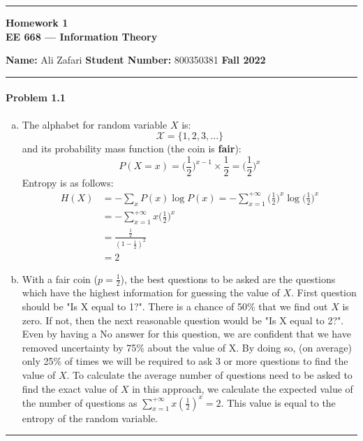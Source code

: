 \documentclass[12pt, letterpaper]{scrartcl}
\begin{document}
    \begin{center}
    	\hrule
    	\vspace{0.4cm}
    	{\textbf { {\large Homework 1} \\ EE 668 --- Information Theory}}
    \end{center}
    { \textbf{Name:} Ali Zafari \hspace{\fill} \textbf{Student Number:} 800350381 \hspace{\fill} \textbf{Fall 2022} } \newline\hrule

\paragraph*{Problem 1.1} \hfill
\begin{enumerate}[a.]
    \item The alphabet for random variable $X$ is:
        \begin{equation*}
            \mathcal{X}=\{1, 2, 3, ...\}
        \end{equation*}
        and its probability mass function (the coin is \textbf{fair}):
        \begin{equation*}
            P(X=x)={(\frac{1}{2}})^{x-1}\times\frac{1}{2}={(\frac{1}{2}})^{x}
        \end{equation*}
        Entropy is as follows:
        \begin{align*}
                H(X)&=-\sum_{x}P(x)\log P(x)=-\sum_{x=1}^{+\infty}{(\frac{1}{2}})^{x}\log{(\frac{1}{2}})^{x} \\
                    &=-\sum_{x=1}^{+\infty}x{(\frac{1}{2}})^{x}\\
                    &=\frac{\frac{1}{2}}{(1-\frac{1}{2})^2}\\
                    &=2
            \end{align*}
            
    \item With a fair coin ($p=\frac{1}{2}$), the best questions to be asked are the questions which have the highest information for guessing the value of $X$. First question should be "Is X equal to 1?". There is a chance of 50\% that we find out $X$ is zero. If not, then the next reasonable question would be "Is X equal to 2?". Even by having a No answer for this question, we are confident that we have removed uncertainty by 75\% about the value of X. By doing so, (on average) only 25\% of times we will be required to ask 3 or more questions to find the value of $X$. To calculate the average number of questions need to be asked to find the exact value of $X$ in this approach, we calculate the expected value of the number of questions as $\sum_{x=1}^{+\infty}x(\frac{1}{2})^x=2$. This value is equal to the entropy of the random variable.
\end{enumerate}
\hrule
\end{document}
